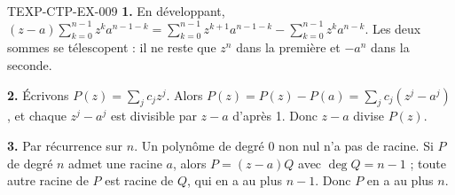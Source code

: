 \begin{corrige}{TEXP-CTP-EX-009}
\textbf{1.} En développant, $(z-a)\sum_{k=0}^{n-1}z^ka^{n-1-k}
=\sum_{k=0}^{n-1}z^{k+1}a^{n-1-k}-\sum_{k=0}^{n-1}z^ka^{n-k}$. Les deux sommes
se télescopent : il ne reste que $z^n$ dans la première et $-a^n$ dans la
seconde.

\textbf{2.} Écrivons $P(z)=\sum_{j}c_jz^j$. Alors
$P(z)=P(z)-P(a)=\sum_j c_j(z^j-a^j)$, et chaque $z^j-a^j$ est divisible par
$z-a$ d'après 1. Donc $z-a$ divise $P(z)$.

\textbf{3.} Par récurrence sur $n$. Un polynôme de degré $0$ non nul n'a pas
de racine. Si $P$ de degré $n$ admet une racine $a$, alors $P=(z-a)Q$ avec
$\deg Q=n-1$ ; toute autre racine de $P$ est racine de $Q$, qui en a au plus
$n-1$. Donc $P$ en a au plus $n$.
\end{corrige}
